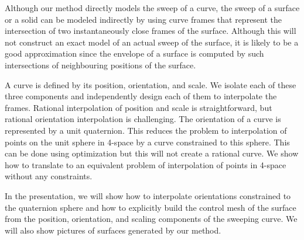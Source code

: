 Although our method directly models the sweep of a curve,
the sweep of a surface or a solid can be modeled indirectly
by using curve frames that represent the intersection of two 
instantaneously close frames of the surface.
Although this will not construct an 
exact model of an actual sweep of the surface,
it is likely to be a good approximation since the 
envelope of a surface is computed by such intersections
of neighbouring positions of the surface.

A curve is defined by its position, orientation, and scale.
We isolate each of these three components and independently 
design each of them to interpolate the frames.
Rational interpolation of position and scale is straightforward, 
but rational orientation interpolation is challenging.
The orientation of a curve is represented by a unit quaternion.
This reduces the problem to interpolation of points on the unit
sphere in 4-space by a curve constrained to this sphere.
This can be done using optimization but this will not create
a rational curve.
We show how to translate to an equivalent problem of interpolation
of points in 4-space without any constraints.


In the presentation, 
we will show how to interpolate orientations constrained to the quaternion sphere
and how to explicitly build the control mesh of the surface from the position,
orientation, and scaling components of the sweeping curve.
We will also show pictures of surfaces generated by our method.


